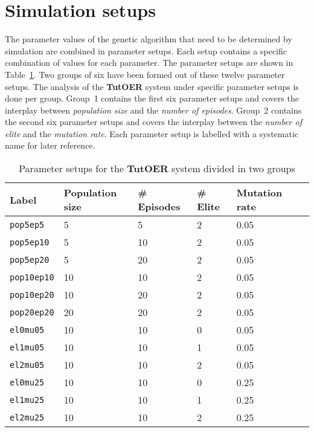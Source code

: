\section{Simulation setups}
\label{sec:simulations_simulations}
The parameter values of the genetic algorithm that need to be determined by
simulation are combined in parameter setups. Each setup contains a specific
combination of values for each parameter. The parameter setups are shown in
Table~\ref{tab:simulation_setups}. Two groups of six have been formed out of
these twelve parameter setups. The analysis of the \textbf{TutOER} system under
specific parameter setups is done per group. Group~1 contains the first six
parameter setups and covers the interplay between \emph{population size} and
the \emph{number of episodes}. Group~2 contains the second six parameter setups
and covers the interplay between the \emph{number of elite} and the
\emph{mutation rate}. Each parameter setup is labelled with a systematic name for
later reference.\\
\begin{table}[h!]
	\centering
	\caption[Parameter setups]{Parameter setups for the \textbf{TutOER} system divided in two groups}
	\label{tab:simulation_setups}
	\begin{tabular}{llllll}\hline
		\textbf{Label} & \textbf{Population size} & \textbf{\# Episodes}
		& \textbf{\# Elite} & \textbf{Mutation rate} \\\hline
		\texttt{pop5ep5} & 5 & 5 & 2 & 0.05 \\ %
		\texttt{pop5ep10} & 5 & 10 & 2 & 0.05 \\ %
		\texttt{pop5ep20} & 5 & 20 & 2 & 0.05 \\ %
		\texttt{pop10ep10} & 10 & 10 & 2 & 0.05 \\ %
		\texttt{pop10ep20} & 10 & 20 & 2 & 0.05 \\ %
		\texttt{pop20ep20} & 20 & 20 & 2 & 0.05 \\\hdashline %
		\texttt{el0mu05} & 10 & 10 & 0 & 0.05 \\ %
		\texttt{el1mu05} & 10 & 10 & 1 & 0.05 \\ %
		\texttt{el2mu05} & 10 & 10 & 2 & 0.05 \\ %
		\texttt{el0mu25} & 10 & 10 & 0 & 0.25 \\ %
		\texttt{el1mu25} & 10 & 10 & 1 & 0.25 \\ %
		\texttt{el2mu25} & 10 & 10 & 2 & 0.25 \\ %
	\end{tabular}
\end{table}\\
